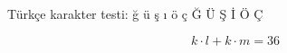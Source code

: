 \documentclass{article}
\begin{document}
Türkçe karakter testi: ğ ü ş ı ö ç Ğ Ü Ş İ Ö Ç

\[
  k \cdot l + k \cdot m = 36
\]
\end{document}
